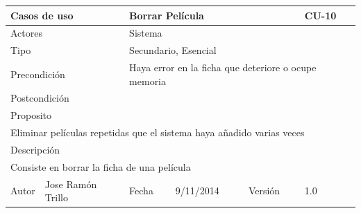 \documentclass{article}
\begin{document}
\begin{table}[h]
\begin{tabular}{|l|l|l|l|l|l|}
\hline
\multicolumn{2}{|p{2cm}|}{Casos de uso}  & \multicolumn{3}{p{7cm}|}{\textbf{Borrar Película}} & CU-10 \\
\hline
\multicolumn{2}{|p{2cm}|}{Actores}       & \multicolumn{4}{p{8cm}|}{Sistema}        \\
\hline
\multicolumn{2}{|p{2cm}|}{Tipo}          & \multicolumn{4}{p{8cm}|}{Secundario, Esencial}        \\
\hline
\multicolumn{2}{|p{2cm}|}{Precondición}  & \multicolumn{4}{p{8cm}|}{Haya error en la ficha que deteriore o ocupe memoria}        \\
\hline
\multicolumn{2}{|p{2cm}|}{Postcondición} & \multicolumn{4}{p{8cm}|}{}        \\
\hline
\multicolumn{6}{|p{10cm}|}{Proposito}                                   \\
\hline
\multicolumn{6}{|p{10cm}|}{Eliminar películas repetidas que el sistema haya añadido varias veces}                                            \\
\hline
\multicolumn{6}{|p{10cm}|}{Descripción}                                 \\
\hline
\multicolumn{6}{|p{10cm}|}{Consiste en borrar la ficha de una película}                                            \\
\hline
Autor              &      Jose Ramón Trillo        & Fecha    & 9/11/2014    &   Versión  &1.0\\
\hline
\end{tabular}
\end{table}
\end{document}

